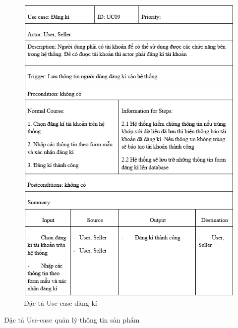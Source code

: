 \documentclass{article}
\begin{document}
{{{{{{{{{	\begin{center}
		\begin{figure}[htp]
			\begin{center}
				\includegraphics[scale=.830]{anh19.png}
			\end{center}
			\caption{Đặc tả Use-case đăng kí}
			
		\end{figure}
	\end{center}
\newpage
{\large Đặc tả Use-case quản lý thông tin sản phẩm
	
}}}}}}}}}}
\end{document}
